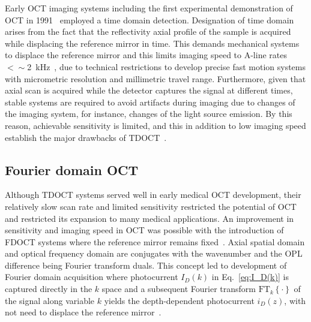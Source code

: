 Early OCT imaging systems including the first experimental demonstration of OCT in 1991~\cite{Huang1991_Optical} employed a time domain detection. Designation of time domain arises from the fact that the reflectivity axial profile of the sample is acquired while displacing the reference mirror in time. This demands mechanical systems to displace the reference mirror and this limits imaging speed to A-line rates $<\sim$2~kHz~\cite{Izatt2015_Theory}, due to technical restrictions to develop precise fast motion systems with micrometric resolution and millimetric travel range. Furthermore, given that axial scan is acquired while the detector captures the signal at different times, stable systems are required to avoid artifacts during imaging due to changes of the imaging system, for instance, changes of the light source emission. By this reason, achievable sensitivity is limited, and this in addition to low imaging speed establish the major drawbacks of TDOCT~\cite{Leitgeb2003_Performance}.

\subsection{Fourier domain OCT}

Although TDOCT systems served well in early medical OCT development, their relatively slow scan rate and limited sensitivity restricted the potential of OCT and restricted its expansion to many medical applications. An improvement in sensitivity and imaging speed in OCT was possible with the introduction of FDOCT systems where the reference mirror remains fixed~\cite{Choma2003_Sensitivity, Leitgeb2003_Performance, deBoer2003_Improved}. Axial spatial domain and optical frequency domain are conjugates with the wavenumber and the OPL difference being Fourier transform duals. This concept led to development of Fourier domain acquisition where photocurrent $I_D(k)$ in Eq.~\eqref{eq:I_D(k)} is captured directly in the $k$ space and a subsequent Fourier transform $\text{FT}_k\left\{\cdot\right\}$ of the signal  along variable $k$ yields the depth-dependent photocurrent $i_D(z)$, with not need to displace the reference mirror~\cite{Fercher1995_Measurement}.

